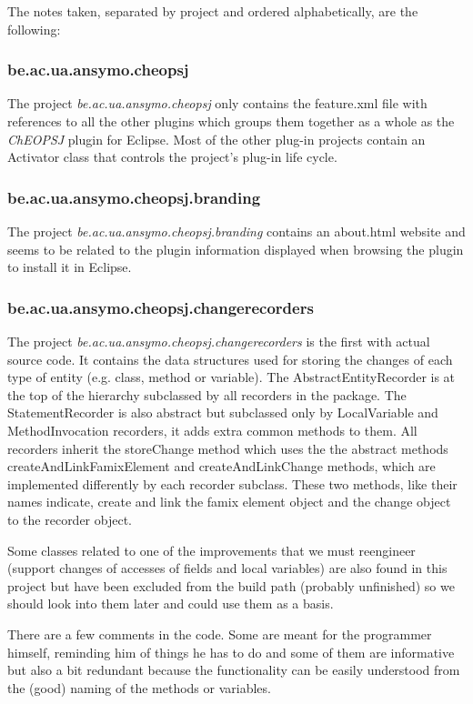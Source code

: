 \documentclass[a4paper]{article}
\begin{document}
The notes taken, separated by project and ordered alphabetically, are the following:

\subsubsection{be.ac.ua.ansymo.cheopsj}
The project \emph{be.ac.ua.ansymo.cheopsj} only contains the feature.xml file with references to all the other plugins which groups them together as a whole as the \emph{ChEOPSJ} plugin for Eclipse. Most of the other plug-in projects contain an Activator class that controls the project's plug-in life cycle.

\subsubsection{be.ac.ua.ansymo.cheopsj.branding}
The project \emph{be.ac.ua.ansymo.cheopsj.branding} contains an about.html website and seems to be related to the plugin information displayed when browsing the plugin to install it in Eclipse.

\subsubsection{be.ac.ua.ansymo.cheopsj.changerecorders}
The project \emph{be.ac.ua.ansymo.cheopsj.changerecorders} is the first with actual source code. It contains the data structures used for storing the changes of each type of entity (e.g. class, method or variable).
The AbstractEntityRecorder is at the top of the hierarchy subclassed by all recorders in the package. The StatementRecorder is also abstract but subclassed only by LocalVariable and MethodInvocation recorders, it adds extra common methods to them. All recorders inherit the storeChange method which uses the the abstract methods createAndLinkFamixElement and createAndLinkChange methods, which are implemented differently by each recorder subclass. These two methods, like their names indicate, create and link the famix element object and the change object to the recorder object.

Some classes related to one of the improvements that we must reengineer (support changes of accesses of fields and local variables) are also found in this project but have been excluded from the build path (probably unfinished) so we should look into them later and could use them as a basis.

There are a few comments in the code. Some are meant for the programmer himself, reminding him of things he has to do and some of them are informative but also a bit redundant because the functionality can be easily understood from the (good) naming of the methods or variables.
\end{document}
